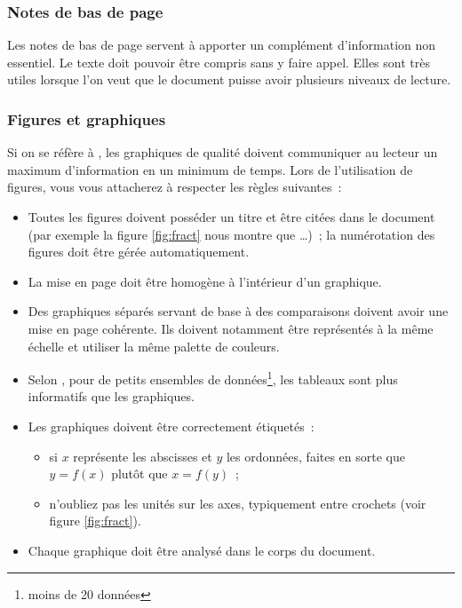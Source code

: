 \subsubsection{Notes de bas de page}

Les notes de bas de page servent à apporter un complément d'information
non essentiel. Le texte doit pouvoir être compris sans y faire appel.
Elles sont très utiles lorsque l'on veut que le document puisse avoir
plusieurs niveaux de lecture.

\subsubsection{Figures et graphiques}

Si on se réfère à \cite{tufte}, les graphiques de qualité doivent
communiquer au lecteur un maximum d'information en un minimum de temps. Lors
de l'utilisation de figures, vous vous attacherez à respecter les règles
suivantes~:
\begin{itemize}
\item Toutes les figures doivent posséder un titre et être citées dans le
  document (par exemple \og{}la figure \ref{fig:fract} nous montre que
  \ldots{}\fg{})~; la numérotation des figures doit être gérée
  automatiquement.
\item La mise en page doit être homogène à l'intérieur d'un graphique.
\item Des graphiques séparés servant de base à des comparaisons doivent avoir
  une mise en page cohérente. Ils doivent notamment être représentés à la même
  échelle et utiliser la même palette de couleurs.
\item Selon \cite{tufte}, pour de petits ensembles de
  données\footnote{moins de 20 données}, les 
  tableaux sont plus informatifs que les graphiques.
\item Les graphiques doivent être correctement étiquetés~:
  \begin{itemize}
  \item si $x$ représente les abscisses et $y$ les ordonnées, faites en sorte
    que $y=f(x)$ plutôt que $x=f(y)$~;
  \item n'oubliez pas les unités sur les axes, typiquement entre crochets
    (voir figure \ref{fig:fract}).
  \end{itemize}
\item Chaque graphique doit être analysé dans le corps du document.
\end{itemize}

